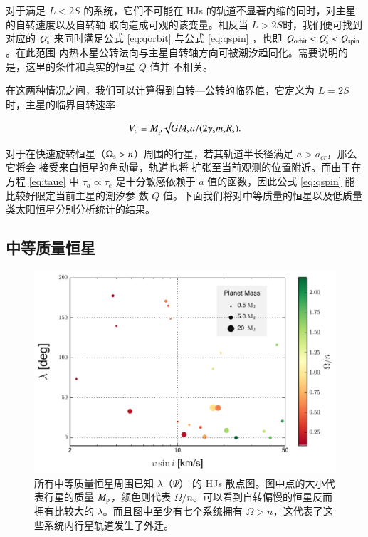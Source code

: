 对于满足 $L< 2S$ 的系统，它们不可能在 HJs 的轨道不显著内缩的同时，对主星的自转速度以及自转轴
取向造成可观的该变量。相反当 $L>2S$时，我们便可找到对应的 $Q_\mathrm{s}^\prime $ 来同时满足公式 
\ref{eq:qorbit} 与公式 \ref{eq:qspin} ，也即 $Q_{\rm orbit} < Q_\mathrm{s}^\prime < Q_{\rm spin}$。在此范围
内热木星公转法向与主星自转轴方向可被潮汐趋同化。需要说明的是，这里的条件和真实的恒星 $Q$ 值并
不相关。

在这两种情况之间，我们可以计算得到自转---公转的临界值，它定义为 $L=2S $时，主星的临界自转速率

\begin{equation} \label{eq:vc}
V_c \equiv {M_\mathrm{p} {\sqrt{G M_\mathrm{s} a}} /( 2 \gamma_\mathrm{s} m_\mathrm{s}R_\mathrm{s}}).
\end{equation} %

对于在快速旋转恒星（$\Omega_\mathrm{s} > n$）周围的行星，若其轨道半长径满足 $a > a_{cr}$，那么它将会
接受来自恒星的角动量，轨道也将	扩张至当前观测的位置附近。而由于在方程 \ref{eq:taue} 中 $\tau_a 
\propto \tau_e$ 是十分敏感依赖于 $a$ 值的函数，因此公式 \ref{eq:qspin} 能比较好限定当前主星的潮汐参
数 $Q$ 值。下面我们将对中等质量的恒星以及低质量类太阳恒星分别分析统计的结果。

\subsection{中等质量恒星} \label{sec:hotstar}

\begin{figure}[t]
\centering
\includegraphics[width=1.0\textwidth]{figures/chapter4/fig9a_hot.pdf}
\caption{所有中等质量恒星周围已知 $\lambda$（$\Psi$） 的 HJs 散点图。图中点的大小代表行星的质量 $M_\mathrm{p}$，颜色则代表 $\Omega/n$。可以看到自转偏慢的恒星反而拥有比较大的 $\lambda$。而且图中至少有七个系统拥有 $\Omega > n$，这代表了这些系统内行星轨道发生了外迁。}
\label{fig:hotobliquity}
\end{figure}


